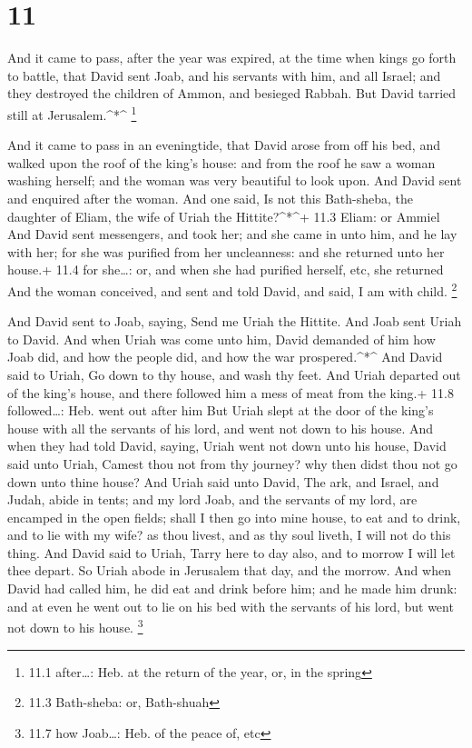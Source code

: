 \hypertarget{section-10}{%
\section{11}\label{section-10}}

 And it came to pass, after the year was expired, at the
time when kings go forth to battle, that David sent Joab, and his
servants with him, and all Israel; and they destroyed the children of
Ammon, and besieged Rabbah. But David tarried still at
Jerusalem.\^{}*\^{} \footnote{11.1 after\ldots: Heb. at the return of
  the year, or, in the spring}

 And it came to pass in an eveningtide, that David arose
from off his bed, and walked upon the roof of the king's house: and from
the roof he saw a woman washing herself; and the woman was very
beautiful to look upon.  And David sent and enquired after
the woman. And one said, Is not this Bath-sheba, the daughter of Eliam,
the wife of Uriah the Hittite?\^{}*\^{}+ 11.3 Eliam: or Ammiel
 And David sent messengers, and took her; and she came in
unto him, and he lay with her; for she was purified from her
uncleanness: and she returned unto her house.+ 11.4 for she\ldots: or,
and when she had purified herself, etc, she returned  And
the woman conceived, and sent and told David, and said, I am with child.
\footnote{11.3 Bath-sheba: or, Bath-shuah}

 And David sent to Joab, saying, Send me Uriah the Hittite.
And Joab sent Uriah to David.  And when Uriah was come unto
him, David demanded of him how Joab did, and how the people did, and how
the war prospered.\^{}*\^{}  And David said to Uriah, Go
down to thy house, and wash thy feet. And Uriah departed out of the
king's house, and there followed him a mess of meat from the king.+ 11.8
followed\ldots: Heb. went out after him  But Uriah slept at
the door of the king's house with all the servants of his lord, and went
not down to his house.  And when they had told David,
saying, Uriah went not down unto his house, David said unto Uriah,
Camest thou not from thy journey? why then didst thou not go down unto
thine house?  And Uriah said unto David, The ark, and
Israel, and Judah, abide in tents; and my lord Joab, and the servants of
my lord, are encamped in the open fields; shall I then go into mine
house, to eat and to drink, and to lie with my wife? as thou livest, and
as thy soul liveth, I will not do this thing.  And David
said to Uriah, Tarry here to day also, and to morrow I will let thee
depart. So Uriah abode in Jerusalem that day, and the morrow.
 And when David had called him, he did eat and drink before
him; and he made him drunk: and at even he went out to lie on his bed
with the servants of his lord, but went not down to his house.
\footnote{11.7 how Joab\ldots: Heb. of the peace of, etc}

